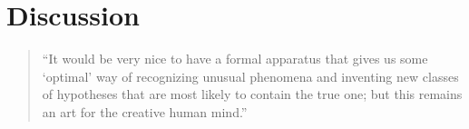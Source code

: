 \documentclass[twoside]{article}
\begin{document}
\section{Discussion}

\begin{quotation}
``It would be very nice to have a formal apparatus that gives us some `optimal' way of recognizing unusual phenomena and inventing new classes of hypotheses that are most likely to contain the true one; but this remains an art for the creative human mind.''

\hspace*{\fill}\citet{Jaynes85highlyinformative}


\end{quotation}


%

\end{document}
